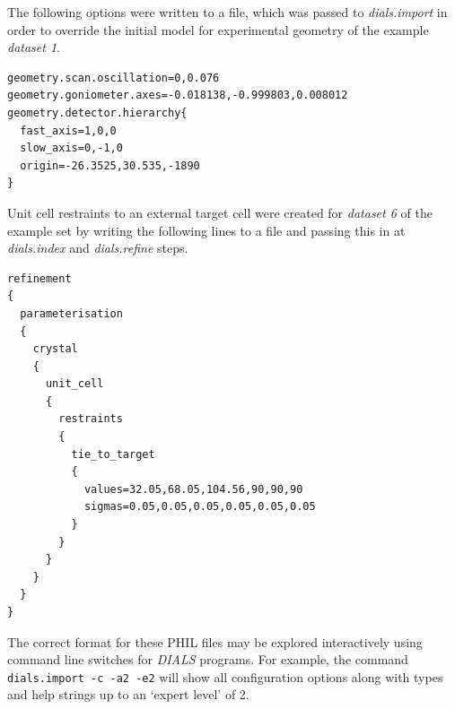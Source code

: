 \documentclass[preprint]{iucr}
\newcommand{\dials}{\emph{DIALS}\xspace}
\newcommand{\dialsimport}{\emph{dials.import}\xspace}
\newcommand{\dialsindex}{\emph{dials.index}\xspace}
\newcommand{\dialsrefine}{\emph{dials.refine}\xspace}
\begin{document}
The following options were written to a file, which was passed to \dialsimport
in order to override the initial model for experimental geometry of the example
\emph{dataset 1}.

\begin{verbatim}
geometry.scan.oscillation=0,0.076
geometry.goniometer.axes=-0.018138,-0.999803,0.008012
geometry.detector.hierarchy{
  fast_axis=1,0,0
  slow_axis=0,-1,0
  origin=-26.3525,30.535,-1890
}
\end{verbatim}

Unit cell restraints to an external target cell were created for
\emph{dataset 6} of
the example set by writing the following lines to a file and passing this in
at \dialsindex and \dialsrefine steps.

\begin{verbatim}
refinement
{
  parameterisation
  {
    crystal
    {
      unit_cell
      {
        restraints
        {
          tie_to_target
          {
            values=32.05,68.05,104.56,90,90,90
            sigmas=0.05,0.05,0.05,0.05,0.05,0.05
          }
        }
      }
    }
  }
}
\end{verbatim}

The correct format for these PHIL files may be explored interactively using
command line switches for \dials programs. For example, the command
\texttt{dials.import -c -a2 -e2} will show all configuration options along with
types and help strings up to an `expert level' of 2.
\end{document}
